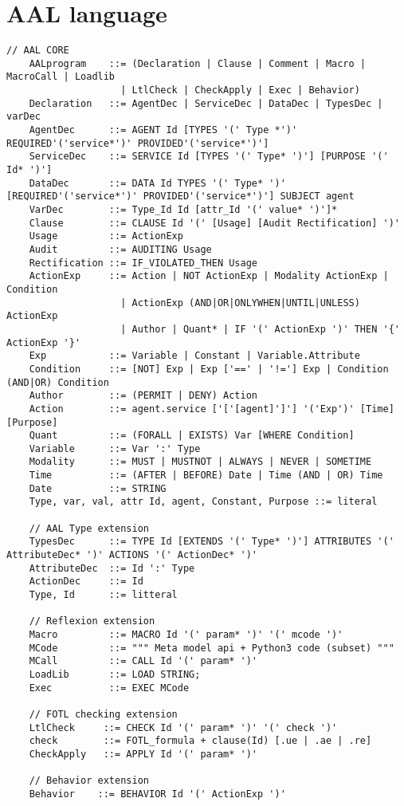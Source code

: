 \section{AAL language}
\begin{lstlisting}[caption={AAL Syntax}, label=syntax]
    // AAL CORE
    AALprogram    ::= (Declaration | Clause | Comment | Macro | MacroCall | Loadlib
                    | LtlCheck | CheckApply | Exec | Behavior)
    Declaration   ::= AgentDec | ServiceDec | DataDec | TypesDec | varDec
    AgentDec      ::= AGENT Id [TYPES '(' Type *')' REQUIRED'('service*')' PROVIDED'('service*')']
    ServiceDec    ::= SERVICE Id [TYPES '(' Type* ')'] [PURPOSE '(' Id* ')']
    DataDec       ::= DATA Id TYPES '(' Type* ')' [REQUIRED'('service*')' PROVIDED'('service*')'] SUBJECT agent
    VarDec        ::= Type_Id Id [attr_Id '(' value* ')']*
    Clause        ::= CLAUSE Id '(' [Usage] [Audit Rectification] ')'
    Usage         ::= ActionExp
    Audit         ::= AUDITING Usage
    Rectification ::= IF_VIOLATED_THEN Usage
    ActionExp     ::= Action | NOT ActionExp | Modality ActionExp | Condition
                    | ActionExp (AND|OR|ONLYWHEN|UNTIL|UNLESS) ActionExp
                    | Author | Quant* | IF '(' ActionExp ')' THEN '{' ActionExp '}'
    Exp           ::= Variable | Constant | Variable.Attribute
    Condition     ::= [NOT] Exp | Exp ['==' | '!='] Exp | Condition (AND|OR) Condition
    Author        ::= (PERMIT | DENY) Action
    Action        ::= agent.service ['['[agent]']'] '('Exp')' [Time] [Purpose]
    Quant         ::= (FORALL | EXISTS) Var [WHERE Condition]
    Variable      ::= Var ':' Type
    Modality      ::= MUST | MUSTNOT | ALWAYS | NEVER | SOMETIME
    Time          ::= (AFTER | BEFORE) Date | Time (AND | OR) Time
    Date          ::= STRING
    Type, var, val, attr Id, agent, Constant, Purpose ::= literal

    // AAL Type extension
    TypesDec      ::= TYPE Id [EXTENDS '(' Type* ')'] ATTRIBUTES '(' AttributeDec* ')' ACTIONS '(' ActionDec* ')'
    AttributeDec  ::= Id ':' Type
    ActionDec     ::= Id
    Type, Id      ::= litteral

    // Reflexion extension
    Macro         ::= MACRO Id '(' param* ')' '(' mcode ')'
    MCode         ::= """ Meta model api + Python3 code (subset) """
    MCall         ::= CALL Id '(' param* ')'
    LoadLib       ::= LOAD STRING;
    Exec          ::= EXEC MCode

    // FOTL checking extension
    LtlCheck     ::= CHECK Id '(' param* ')' '(' check ')'
    check        ::= FOTL_formula + clause(Id) [.ue | .ae | .re]
    CheckApply   ::= APPLY Id '(' param* ')'

    // Behavior extension
    Behavior    ::= BEHAVIOR Id '(' ActionExp ')'

\end{lstlisting}